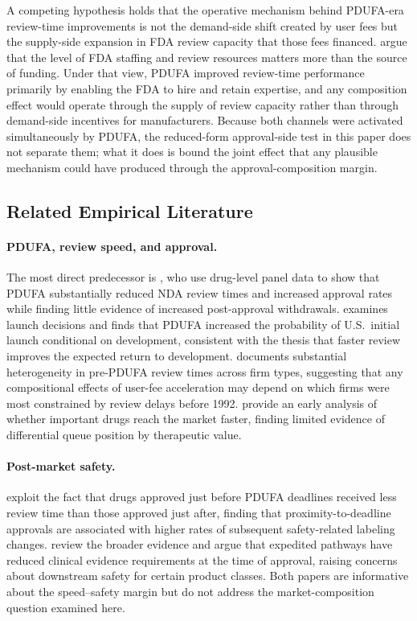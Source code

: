A competing hypothesis holds that the operative mechanism behind PDUFA-era review-time improvements is not the demand-side shift created by user fees but the supply-side expansion in FDA review capacity that those fees financed. \textcite{ApprovalTimesNew} argue that the level of FDA staffing and review resources matters more than the source of funding. Under that view, PDUFA improved review-time performance primarily by enabling the FDA to hire and retain expertise, and any composition effect would operate through the supply of review capacity rather than through demand-side incentives for manufacturers. Because both channels were activated simultaneously by PDUFA, the reduced-form approval-side test in this paper does not separate them; what it does is bound the joint effect that any plausible mechanism could have produced through the approval-composition margin.

\subsection{Related Empirical Literature}

\paragraph{PDUFA, review speed, and approval.}
The most direct predecessor is \textcite{berndtIndustryFundingFDA2005}, who use drug-level panel data to show that PDUFA substantially reduced NDA review times and increased approval rates while finding little evidence of increased post-approval withdrawals. \textcite{olsonPDUFAInitialUS2009} examines launch decisions and finds that PDUFA increased the probability of U.S.\ initial launch conditional on development, consistent with the thesis that faster review improves the expected return to development. \textcite{olsonFirmCharacteristicsSpeed1997} documents substantial heterogeneity in pre-PDUFA review times across firm types, suggesting that any compositional effects of user-fee acceleration may depend on which firms were most constrained by review delays before 1992. \textcite{dranoveImportantDrugsReach1994} provide an early analysis of whether important drugs reach the market faster, finding limited evidence of differential queue position by therapeutic value.

\paragraph{Post-market safety.}
\textcite{carpenterDrugreviewDeadlinesSafety2008} exploit the fact that drugs approved just before PDUFA deadlines received less review time than those approved just after, finding that proximity-to-deadline approvals are associated with higher rates of subsequent safety-related labeling changes. \textcite{darrowFDAApprovalRegulation2020} review the broader evidence and argue that expedited pathways have reduced clinical evidence requirements at the time of approval, raising concerns about downstream safety for certain product classes. Both papers are informative about the speed--safety margin but do not address the market-composition question examined here.

